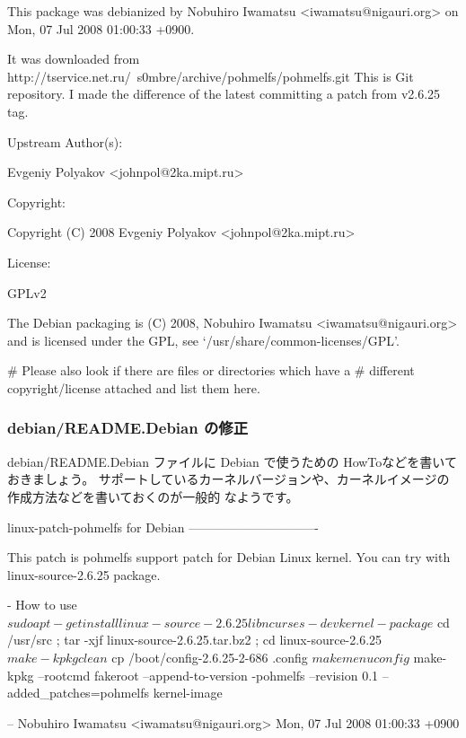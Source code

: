 \documentclass[mingoth,a4paper]{jsarticle}
\begin{document}
\begin{commandline}
This package was debianized by Nobuhiro Iwamatsu <iwamatsu@nigauri.org> on
Mon, 07 Jul 2008 01:00:33 +0900.

It was downloaded from
        http://tservice.net.ru/~s0mbre/archive/pohmelfs/pohmelfs.git
This is Git repository. I made the difference of the latest committing a
patch from v2.6.25 tag.

Upstream Author(s):

    Evgeniy Polyakov <johnpol@2ka.mipt.ru>

Copyright:

    Copyright (C) 2008 Evgeniy Polyakov <johnpol@2ka.mipt.ru>

License:

 GPLv2

The Debian packaging is (C) 2008, Nobuhiro Iwamatsu <iwamatsu@nigauri.org> and
is licensed under the GPL, see `/usr/share/common-licenses/GPL'.

# Please also look if there are files or directories which have a
# different copyright/license attached and list them here.

\end{commandline}

\subsubsection{debian/README.Debian の修正}
debian/README.Debian ファイルに Debian で使うための HowToなどを書いておきましょう。
サポートしているカーネルバージョンや、カーネルイメージの作成方法などを書いておくのが一般的
なようです。

\begin{commandline}
linux-patch-pohmelfs for Debian
-------------------------------

This patch is pohmelfs support patch for Debian Linux kernel. 
You can try with linux-source-2.6.25 package. 

- How to use
  $ sudo apt-get install linux-source-2.6.25 libncurses-dev kernel-package
  $ cd /usr/src ; tar -xjf linux-source-2.6.25.tar.bz2 ; cd linux-source-2.6.25
  $ make-kpkg clean
  $ cp /boot/config-2.6.25-2-686 .config
  $ make menuconfig
  $ make-kpkg --rootcmd fakeroot --append-to-version -pohmelfs --revision 0.1 --added_patches=pohmelfs kernel-image

 -- Nobuhiro Iwamatsu <iwamatsu@nigauri.org>  Mon, 07 Jul 2008 01:00:33 +0900

\end{commandline}
\end{document}

